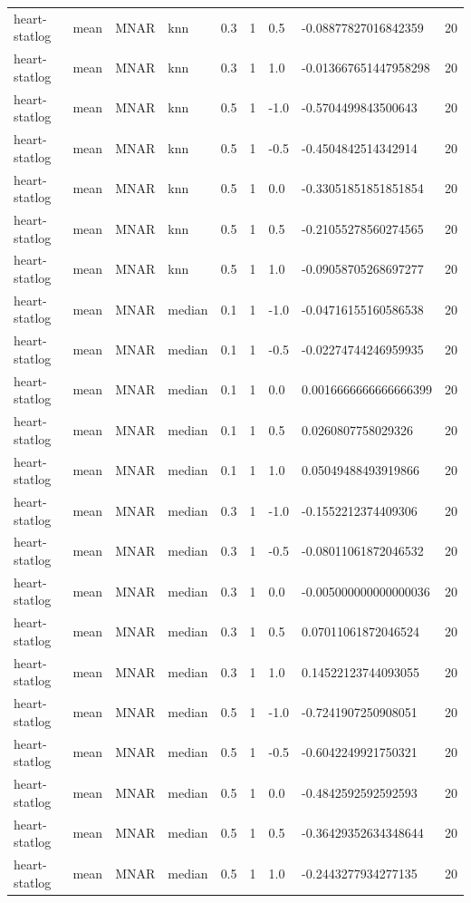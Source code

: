 \begin{tabular}{lllllllll}
heart-statlog & mean & MNAR & knn & 0.3 & 1 & 0.5 & -0.08877827016842359 & 20 \\
heart-statlog & mean & MNAR & knn & 0.3 & 1 & 1.0 & -0.013667651447958298 & 20 \\
heart-statlog & mean & MNAR & knn & 0.5 & 1 & -1.0 & -0.5704499843500643 & 20 \\
heart-statlog & mean & MNAR & knn & 0.5 & 1 & -0.5 & -0.4504842514342914 & 20 \\
heart-statlog & mean & MNAR & knn & 0.5 & 1 & 0.0 & -0.33051851851851854 & 20 \\
heart-statlog & mean & MNAR & knn & 0.5 & 1 & 0.5 & -0.21055278560274565 & 20 \\
heart-statlog & mean & MNAR & knn & 0.5 & 1 & 1.0 & -0.09058705268697277 & 20 \\
heart-statlog & mean & MNAR & median & 0.1 & 1 & -1.0 & -0.04716155160586538 & 20 \\
heart-statlog & mean & MNAR & median & 0.1 & 1 & -0.5 & -0.02274744246959935 & 20 \\
heart-statlog & mean & MNAR & median & 0.1 & 1 & 0.0 & 0.0016666666666666399 & 20 \\
heart-statlog & mean & MNAR & median & 0.1 & 1 & 0.5 & 0.0260807758029326 & 20 \\
heart-statlog & mean & MNAR & median & 0.1 & 1 & 1.0 & 0.05049488493919866 & 20 \\
heart-statlog & mean & MNAR & median & 0.3 & 1 & -1.0 & -0.1552212374409306 & 20 \\
heart-statlog & mean & MNAR & median & 0.3 & 1 & -0.5 & -0.08011061872046532 & 20 \\
heart-statlog & mean & MNAR & median & 0.3 & 1 & 0.0 & -0.005000000000000036 & 20 \\
heart-statlog & mean & MNAR & median & 0.3 & 1 & 0.5 & 0.07011061872046524 & 20 \\
heart-statlog & mean & MNAR & median & 0.3 & 1 & 1.0 & 0.14522123744093055 & 20 \\
heart-statlog & mean & MNAR & median & 0.5 & 1 & -1.0 & -0.7241907250908051 & 20 \\
heart-statlog & mean & MNAR & median & 0.5 & 1 & -0.5 & -0.6042249921750321 & 20 \\
heart-statlog & mean & MNAR & median & 0.5 & 1 & 0.0 & -0.4842592592592593 & 20 \\
heart-statlog & mean & MNAR & median & 0.5 & 1 & 0.5 & -0.36429352634348644 & 20 \\
heart-statlog & mean & MNAR & median & 0.5 & 1 & 1.0 & -0.2443277934277135 & 20 \\

\end{tabular}
